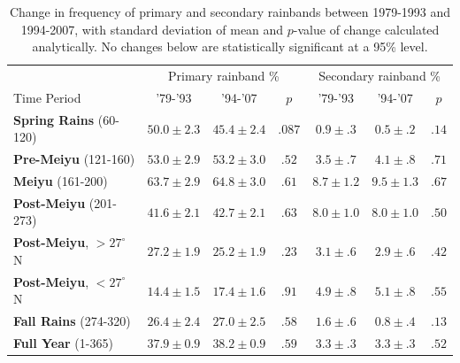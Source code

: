 \documentclass{ametsoc}
\begin{document}
\begin{table}

\centering

\caption{Change in frequency of primary and secondary rainbands between 1979-1993 and 1994-2007, with standard deviation of mean and $p$-value of change calculated analytically. No changes below are statistically significant at a 95\% level.}

\begin{tabular}{ l c c c c c c}
	& \multicolumn{3}{c}{Primary rainband \%} & \multicolumn{3}{c}{Secondary rainband \%} \\
	Time Period & '79-'93 & '94-'07 & $p$ & '79-'93 & '94-'07 & $p$ \\
	\hline	
	\textbf{Spring Rains} (60-120)		& $50.0 \pm 2.3$ & $45.4 \pm 2.4$ & $ .087 $ 	& $0.9 \pm .3$ 	& $0.5 \pm .2$ & $.14$ \\
	\textbf{Pre-Meiyu} (121-160) 		& $53.0 \pm 2.9$ & $53.2 \pm 3.0$ & $ .52$ 	& $3.5 \pm .7$ 	& $4.1 \pm .8$ & $.71$ \\
	\textbf{Meiyu} (161-200)			& $63.7 \pm 2.9$ & $64.8 \pm 3.0$ & $ .61 $ 	& $8.7 \pm 1.2$ 	& $9.5 \pm 1.3$  & $.67$ \\
	\textbf{Post-Meiyu} (201-273)		& $41.6 \pm 2.1$ & $42.7 \pm 2.1$ & $ .63 $	& $8.0 \pm 1.0$ 	& $8.0 \pm 1.0$ & $.50$ \\
	\textbf{Post-Meiyu}, $>27^\circ$N 	& $27.2 \pm 1.9$ & $25.2 \pm 1.9$ & $ .23 $ 	& $3.1 \pm .6$ 	& $2.9 \pm .6$ & $.42$ \\
	\textbf{Post-Meiyu}, $<27^\circ$N 	& $14.4 \pm 1.5 $ & $17.4 \pm 1.6$ & $ .91 $ 	& $4.9 \pm .8$ 	& $5.1 \pm .8$ & $.55$  \\
	\textbf{Fall Rains} (274-320)			& $26.4 \pm 2.4 $ & $27.0 \pm 2.5$ & $ .58 $ 	& $1.6 \pm .6$ 	& $0.8 \pm .4$ & $.13$ \\
	\textbf{Full Year} (1-365)			& $37.9 \pm 0.9 $ & $38.2 \pm 0.9$ & $ .59 $ 	& $3.3 \pm .3$ 	& $3.3 \pm .3$ & $.52$ \\

\end{tabular}
\label{tab:t37}
\end{table}
\end{document}
